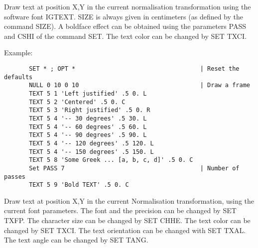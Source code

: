 \ENDCMD


\BEGARG
{}
\ENDARG
{}
\ENDOPT

   \par
Draw text at position X,Y in the current normalisation transformation using 
   the software font IGTEXT. SIZE is always given in centimeters (as defined 
   by the command SIZE). A boldface effect can be obtained using the 
   parameters PASS and CSHI of the command SET. The text color can be changed 
   by SET TXCI.  

   \par
Example:  
\begin{verbatim}
       SET * ; OPT *                                   | Reset the defaults
       NULL 0 10 0 10                                  | Draw a frame
       TEXT 5 1 'Left justified' .5 0. L
       TEXT 5 2 'Centered' .5 0. C
       TEXT 5 3 'Right justified' .5 0. R
       TEXT 5 4 '-- 30 degrees' .5 30. L
       TEXT 5 4 '-- 60 degrees' .5 60. L
       TEXT 5 4 '-- 90 degrees' .5 90. L
       TEXT 5 4 '-- 120 degrees' .5 120. L
       TEXT 5 4 '-- 150 degrees' .5 150. L
       TEXT 5 8 'Some Greek ... [a, b, c, d]' .5 0. C
       Set PASS 7                                      | Number of passes
       TEXT 5 9 'Bold TEXT' .5 0. C
\end{verbatim}

\ENDCMD


\BEGARG
{}
\ENDARG

   \par
Draw text at position X,Y in the current Normalisation transformation, 
   using the current font parameters.  The font and the precision can be 
   changed by SET TXFP.  The character size can be changed by SET CHHE.  The 
   text color can be changed by SET TXCI.  The text orientation can be changed 
   with SET TXAL.  The text angle can be changed by SET TANG.  

